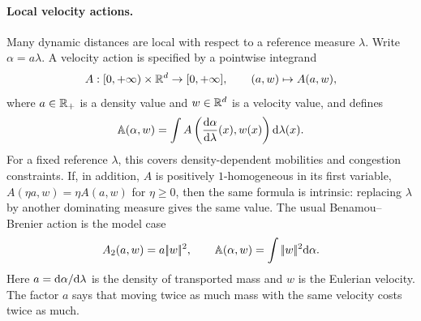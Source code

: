 \paragraph{Local velocity actions.}
Many dynamic distances are local with respect to a reference measure $\lambda$. Write $\alpha=a\lambda$. A velocity action is specified by a pointwise integrand
\[
	A:[0,+\infty)\times\mathbb{R}^d\to[0,+\infty],
	\qquad
	(a,w)\mapsto A(a,w),
\]
where $a\in\mathbb{R}_+$ is a density value and $w\in\mathbb{R}^d$ is a velocity value, and defines
\begin{equation}\label{eq-local-velocity-action}
	\mathbb A(\alpha,w)
	=
	\int A\left(\frac{\mathrm{d}\alpha}{\mathrm{d}\lambda}(x),w(x)\right)\mathrm{d}\lambda(x).
\end{equation}
For a fixed reference $\lambda$, this covers density-dependent mobilities and congestion constraints. If, in addition, $A$ is positively $1$-homogeneous in its first variable, $A(\eta a,w)=\eta A(a,w)$ for $\eta\geq0$, then the same formula is intrinsic: replacing $\lambda$ by another dominating measure gives the same value. The usual Benamou--Brenier action is the model case
\begin{equation}\label{eq-bb-velocity-action}
	A_2(a,w)=a|\!| w |\!|^2,
	\qquad
	\mathbb A(\alpha,w)=\int|\!| w |\!|^2\mathrm{d}\alpha.
\end{equation}
Here \(a=\mathrm{d}\alpha/\mathrm{d}\lambda\) is the density of transported mass and \(w\) is the Eulerian velocity. The factor \(a\) says that moving twice as much mass with the same velocity costs twice as much.

